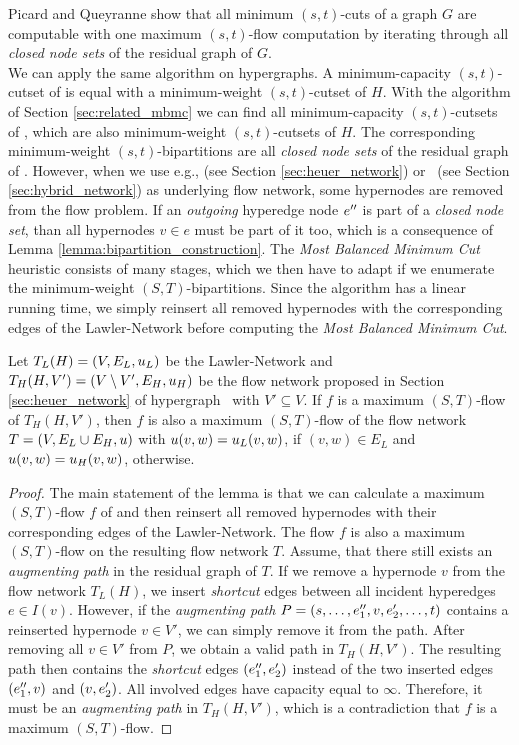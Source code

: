 Picard and Queyranne \cite{picard1980structure} show that all minimum $(s,t)$-cuts 
of a graph $G$ are computable with one maximum $(s,t)$-flow computation by 
iterating through all \emph{closed node sets} of the residual graph of $G$. \\
We can apply the same algorithm on hypergraphs. A minimum-capacity $(s,t)$-cutset of 
is equal with a minimum-weight $(s,t)$-cutset of $H$. With the algorithm
of Section \ref{sec:related_mbmc} we can find all minimum-capacity
$(s,t)$-cutsets of , which are also minimum-weight $(s,t)$-cutsets
of $H$. The corresponding minimum-weight $(s,t)$-bipartitions are all
\emph{closed node sets} of the residual graph of . 
However, when we use e.g.,  (see Section \ref{sec:heuer_network})
or \ShortHybrid~(see Section \ref{sec:hybrid_network}) as underlying flow network,
some hypernodes are removed from the flow problem. If an
\emph{outgoing} hyperedge node $e''$ is part of a \emph{closed node set}, than
all hypernodes $v \in e$ must be part of it too, which is a consequence of Lemma \ref{lemma:bipartition_construction}. 
The \emph{Most Balanced Minimum Cut} heuristic consists of many stages, which we then have to adapt if we enumerate the minimum-weight
$(S,T)$-bipartitions. Since the algorithm has a linear running time, we simply reinsert all
removed hypernodes with the corresponding edges of the Lawler-Network before computing 
the \emph{Most Balanced Minimum Cut}. 
\begin{lemma}
Let $T_L(H) = (V,E_L,u_L)$ be the Lawler-Network and $T_H(H,V') = (V \setminus V', E_H, u_H)$ be the
flow network proposed in Section \ref{sec:heuer_network} of hypergraph \HypergraphDef~with $V' \subseteq V$.
If $f$ is a maximum $(S,T)$-flow of $T_H(H,V')$, then $f$ is also a maximum $(S,T)$-flow of the
flow network $T = (V, E_L \cup E_H, u)$ with $u(v,w) = u_L(v,w)$, if
$(v,w) \in E_L$ and $u(v,w) = u_H(v,w)$, otherwise.
\end{lemma}
\begin{proof}
The main statement of the lemma is that we can calculate a maximum $(S,T)$-flow $f$ of 
 and then reinsert all removed hypernodes with their corresponding edges of the Lawler-Network.
The flow $f$ is also a maximum $(S,T)$-flow on the resulting flow network $T$.
Assume, that there still exists an \emph{augmenting path} in the residual graph of $T$.
If we remove a hypernode $v$ from the flow network $T_L(H)$, we insert \emph{shortcut} edges
between all incident hyperedges $e \in I(v)$. However, if the \emph{augmenting path} $P = (s,\ldots,e_1'',v,e_2',\ldots,t)$
contains a reinserted hypernode $v \in V'$, we can simply remove it from the path. 
After removing all $v \in V'$ from $P$, we obtain a valid path in $T_H(H,V')$. 
The resulting path then contains the \emph{shortcut} edges $(e_1'',e_2')$
instead of the two inserted edges $(e_1'',v)$ and $(v,e_2')$. All involved edges
have capacity equal to $\infty$. Therefore, it must be an \emph{augmenting path} in $T_H(H,V')$, 
which is a contradiction that $f$ is a maximum $(S,T)$-flow.
\end{proof}

